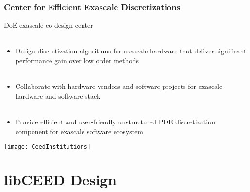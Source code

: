 \documentclass{beamer}
\begin{document}
\begin{frame}
\begin{center}
\frametitle{Center for Efficient Exascale Discretizations}

\begin{flushleft}
DoE exascale co-design center\\

~\\
\end{flushleft}

\begin{itemize}

\item Design discretization algorithms for exascale hardware that deliver significant performance gain over low order methods\\

~\\

\item Collaborate with hardware vendors and software projects for exascale hardware and software stack\\

~\\

\item Provide efficient and user-friendly unstructured PDE discretization component for exascale software ecosystem

\end{itemize}

\texttt{[image: CeedInstitutions]}\\

\end{center}
\end{frame}

\section{libCEED Design}
\end{document}
